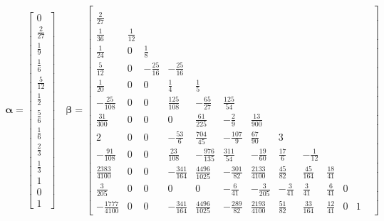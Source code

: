 \begin{align}
	\bm \alpha = \begin{bmatrix}
		0\\[6pt]
		\frac{2}{27}\\[6pt]
		\frac{1}{9}\\[6pt]
		\frac{1}{6}\\[6pt]
		\frac{5}{12}\\[6pt]
		\frac{1}{2}\\[6pt]
		\frac{5}{6}\\[6pt]
		\frac{1}{6}\\[6pt]
		\frac{2}{3}\\[6pt]
		\frac{1}{3}\\[6pt]
		1\\[6pt]
		0\\[6pt]
		1
	\end{bmatrix} \quad \bm \beta=\begin{bmatrix}
		& & & & & & & & & & & & \\[6pt]
		\frac{2}{27} & & & & & & & & & & & \\[6pt]
		\frac{1}{36} & \frac{1}{12} & & & & & & & & & & \\[6pt]
		\frac{1}{24} & 0 & \frac{1}{8} & & & & & & & & & \\[6pt]
		\frac{5}{12} & 0 & -\frac{25}{16} & -\frac{25}{16} & & & & & & & & \\[6pt]
		\frac{1}{20} & 0 & 0 & \frac{1}{4} & \frac{1}{5} & & & & & & & \\[6pt]
		-\frac{25}{108} & 0 & 0 & \frac{125}{108} & -\frac{65}{27} & \frac{125}{54} & & & & & & \\[6pt]
		\frac{31}{300} & 0 & 0 & 0 & \frac{61}{225} & -\frac{2}{9} & \frac{13}{900} & & & & & \\[6pt]
		2 & 0 & 0 & -\frac{53}{6} & \frac{704}{45} & -\frac{107}{9} & \frac{67}{90} & 3 & & & & \\[6pt]
		-\frac{91}{108} & 0 & 0 & \frac{23}{108} & -\frac{976}{135} & \frac{311}{54} & -\frac{19}{60} & \frac{17}{6} & -\frac{1}{12} & & & \\[6pt]
		\frac{2383}{4100} & 0 & 0 & -\frac{341}{164} & \frac{4496}{1025} & -\frac{301}{82} & \frac{2133}{4100} & \frac{45}{82} & \frac{45}{164} & \frac{18}{41} & & \\[6pt]
		\frac{3}{205} & 0 & 0 & 0 & 0 & -\frac{6}{41} & -\frac{3}{205} & -\frac{3}{41} & \frac{3}{41} & \frac{6}{41} & 0 & \\[6pt]
		-\frac{1777}{4100} & 0 & 0 & -\frac{341}{164} & \frac{4496}{1025} & -\frac{289}{82} & \frac{2193}{4100} & \frac{51}{82} & \frac{33}{164} & \frac{12}{41} & 0 & 1
	\end{bmatrix}
\end{align}
